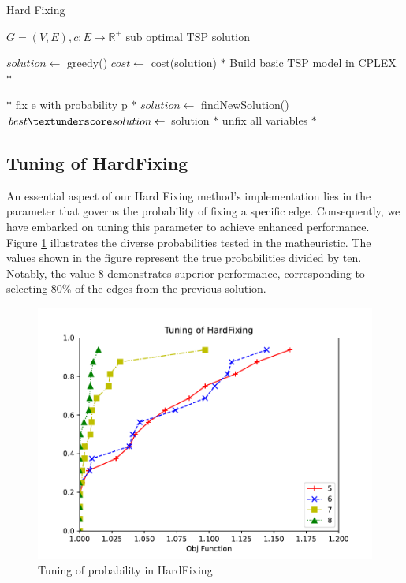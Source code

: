 \begin{algorithm}
    \caption{Hard Fixing}\label{algo:HardFixing}
    \begin{algorithmic}[1]
    \Require $G = (V,E), c:E \to \mathbb{R}^+$
    \Ensure $\text{sub optimal TSP solution}$

    \State $solution \gets$ greedy()
    \State $cost \gets $ cost(solution)
    \State $*$ Build basic TSP model in CPLEX $*$



    \State $*$ fix e with probability p $*$
    \EndFor
    \State $solution \gets$ findNewSolution()
    \State $ best\textunderscore solution \gets$ solution
    \EndIf
    \State $*$ unfix all variables $*$
    \EndWhile

    \end{algorithmic}
\end{algorithm}

\subsection{Tuning of HardFixing}
An essential aspect of our Hard Fixing method's implementation lies in the parameter that governs the probability of fixing a specific edge. Consequently, we have embarked on tuning this parameter to achieve enhanced performance.
\\
Figure \ref{fig:hard} illustrates the diverse probabilities tested in the matheuristic. The values shown in the figure represent the true probabilities divided by ten. Notably, the value 8 demonstrates superior performance, corresponding to selecting 80\% of the edges from the previous solution.
\begin{figure}[!h]
    \centering
    \includegraphics[width=\textwidth]{images/hard.pdf}
    \caption{Tuning of probability in HardFixing}
    \label{fig:hard}
\end{figure}

